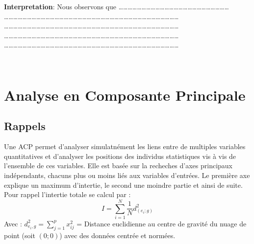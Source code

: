 \documentclass[
]{article}
\begin{document}
\textbf{Interpretation}: Nous observons que
\ldots\ldots\ldots\ldots\ldots\ldots\ldots\ldots\ldots\ldots\ldots\ldots\ldots\ldots\ldots\ldots\ldots\ldots\ldots\ldots\ldots\ldots\ldots\ldots{}\\
\ldots\ldots\ldots\ldots\ldots\ldots\ldots\ldots\ldots\ldots\ldots\ldots\ldots\ldots\ldots\ldots\ldots\ldots\ldots\ldots\ldots\ldots\ldots\ldots\ldots\ldots\ldots\ldots\ldots\ldots\ldots\ldots\ldots\ldots\ldots\ldots\ldots\ldots{}
\ldots\ldots\ldots\ldots\ldots\ldots\ldots\ldots\ldots\ldots\ldots\ldots\ldots\ldots\ldots\ldots\ldots\ldots\ldots\ldots\ldots\ldots\ldots\ldots\ldots\ldots\ldots\ldots\ldots\ldots\ldots\ldots\ldots\ldots\ldots\ldots\ldots\ldots{}
\ldots\ldots\ldots\ldots\ldots\ldots\ldots\ldots\ldots\ldots\ldots\ldots\ldots\ldots\ldots\ldots\ldots\ldots\ldots\ldots\ldots\ldots\ldots\ldots\ldots\ldots\ldots\ldots\ldots\ldots\ldots\ldots\ldots\ldots\ldots\ldots\ldots\ldots{}
\ldots\ldots\ldots\ldots\ldots\ldots\ldots\ldots\ldots\ldots\ldots\ldots\ldots\ldots\ldots\ldots\ldots\ldots\ldots\ldots\ldots\ldots\ldots\ldots\ldots\ldots\ldots\ldots\ldots\ldots\ldots\ldots\ldots\ldots\ldots\ldots\ldots\ldots{}

~

\hypertarget{analyse-en-composante-principale}{%
\section{\texorpdfstring{\textbf{Analyse en Composante Principale
}}{Analyse en Composante Principale }}\label{analyse-en-composante-principale}}

\hypertarget{rappels}{%
\subsection{\texorpdfstring{\textbf{Rappels}}{Rappels}}\label{rappels}}

Une ACP permet d'analyser simulatnément les liens entre de multiples
variables quantitatives et d'analyser les positions des individus
statistiques vis à vis de l'ensemble de ces variables. Elle est basée
sur la recheches d'axes principaux indépendants, chacuns plus ou moins
liés aux variables d'entrées. Le première axe explique un maximum
d'intertie, le second une moindre partie et ainsi de suite. Pour rappel
l'intertie totale se calcul par :
\[I=\sum^N_{i=1}\frac{1}{N}d^2_{(e_i;g)}\] Avec :
\(d^2_{e_i,g}=\sum^p_{j=1}x^2_{ij}\) = Distance euclidienne au centre de
gravité du nuage de point (soit \((0;0)\)) avec des données centrée et
normées.
\end{document}

